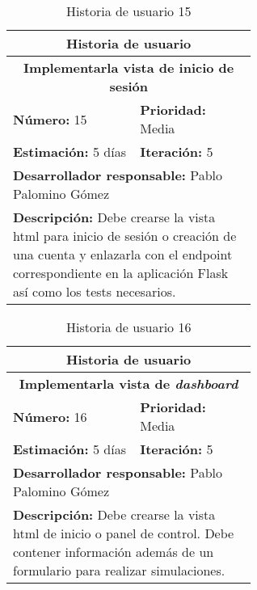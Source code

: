\begin{table}[H]
        \centering
        \begin{tabular}{|p{0.3\linewidth}|p{0.3\linewidth}|}
          \hline
          \multicolumn{2}{|c|}{Historia de usuario}\\ \hline
          \multicolumn{2}{|c|}{\textbf{Implementarla vista de inicio de sesión}}\\ \hline
          \textbf{Número:} 15 & \textbf{Prioridad:} Media\\ \hline
          \textbf{Estimación:} 5 días & \textbf{Iteración:} 5\\ \hline
          \multicolumn{2}{|l|}{\textbf{Desarrollador responsable:} Pablo Palomino Gómez}\\ \hline
          \multicolumn{2}{|p{0.6\linewidth}|}{\textbf{Descripción:} Debe crearse la vista html para inicio de sesión o creación de una cuenta y enlazarla con el endpoint correspondiente en la aplicación Flask así como los tests necesarios.}\\ \hline
        \end{tabular}
        \caption{Historia de usuario 15}
        \label{tab:hist15}
\end{table}
\begin{table}[H]
        \centering
        \begin{tabular}{|p{0.3\linewidth}|p{0.3\linewidth}|}
          \hline
          \multicolumn{2}{|c|}{Historia de usuario}\\ \hline
          \multicolumn{2}{|c|}{\textbf{Implementarla vista de \textit{dashboard}}}\\ \hline
          \textbf{Número:} 16 & \textbf{Prioridad:} Media\\ \hline
          \textbf{Estimación:} 5 días & \textbf{Iteración:} 5\\ \hline
          \multicolumn{2}{|l|}{\textbf{Desarrollador responsable:} Pablo Palomino Gómez}\\ \hline
          \multicolumn{2}{|p{0.6\linewidth}|}{\textbf{Descripción:} Debe crearse la vista html de inicio o panel de control. Debe contener información además de un formulario para realizar simulaciones.}\\ \hline
        \end{tabular}
        \caption{Historia de usuario 16}
        \label{tab:hist16}
\end{table}
